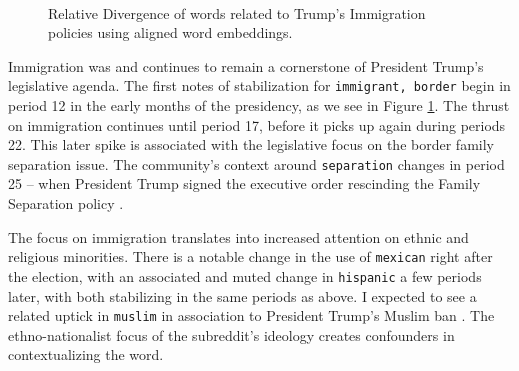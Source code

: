 \begin{figure}[t]
     ~
    ~
    
    \caption{Relative Divergence of words related to Trump's Immigration policies using aligned word embeddings.}%

    \label{fig:div_immigr}%

\end{figure}

Immigration was and continues to remain a cornerstone of President Trump's legislative agenda. The first notes of stabilization for \texttt{immigrant, border} begin in period 12 in the early months of the presidency, as we see in Figure \ref{fig:div_immigr}. The thrust on immigration continues until period 17, before it picks up again during periods 22. This later spike is associated with the legislative focus on the border family separation issue. The community's context around \texttt{separation} changes in period 25 -- when President Trump signed the executive order rescinding the Family Separation policy \citep{noauthor_family_nodate}. 

The focus on immigration translates into increased attention on ethnic and religious minorities. There is a notable change in the use of \texttt{mexican} right after the election, with an associated and muted change in \texttt{hispanic} a few periods later, with both stabilizing in the same periods as above. I expected to see a related uptick in \texttt{muslim} in association to President Trump's Muslim ban \citep{noauthor_timeline_2017}. The ethno-nationalist focus of the subreddit's ideology creates confounders in contextualizing the word.


